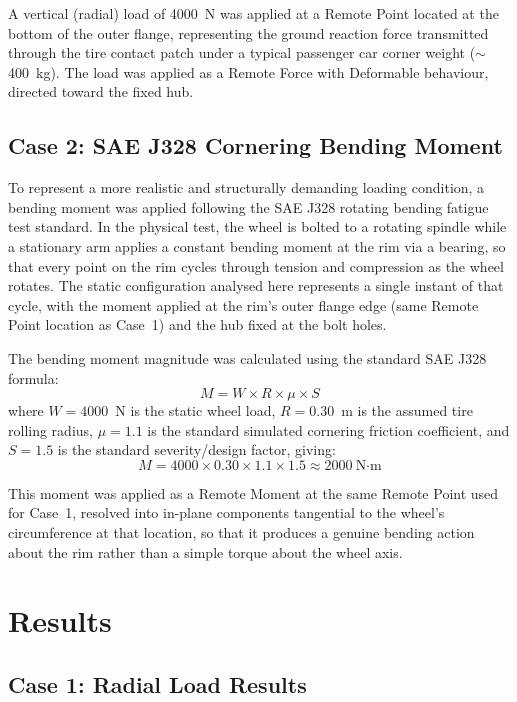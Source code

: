 \documentclass[11pt]{article}
\begin{document}
A vertical (radial) load of 4000~N was applied at a Remote Point located at the bottom of
the outer flange, representing the ground reaction force transmitted through the tire
contact patch under a typical passenger car corner weight ($\sim$400~kg). The load was
applied as a Remote Force with Deformable behaviour, directed toward the fixed hub.

\subsection{Case 2: SAE J328 Cornering Bending Moment}

To represent a more realistic and structurally demanding loading condition, a bending
moment was applied following the SAE J328 rotating bending fatigue test standard. In the
physical test, the wheel is bolted to a rotating spindle while a stationary arm applies a
constant bending moment at the rim via a bearing, so that every point on the rim cycles
through tension and compression as the wheel rotates. The static configuration analysed
here represents a single instant of that cycle, with the moment applied at the rim's outer
flange edge (same Remote Point location as Case~1) and the hub fixed at the bolt holes.

The bending moment magnitude was calculated using the standard SAE J328 formula:
\begin{equation}
M = W \times R \times \mu \times S
\label{eq:sae}
\end{equation}
where $W = 4000$~N is the static wheel load, $R = 0.30$~m is the assumed tire rolling
radius, $\mu = 1.1$ is the standard simulated cornering friction coefficient, and
$S = 1.5$ is the standard severity/design factor, giving:
\begin{equation}
M = 4000 \times 0.30 \times 1.1 \times 1.5 \approx 2000\ \text{N·m}
\label{eq:sae_value}
\end{equation}

This moment was applied as a Remote Moment at the same Remote Point used for Case~1,
resolved into in-plane components tangential to the wheel's circumference at that
location, so that it produces a genuine bending action about the rim rather than a
simple torque about the wheel axis.

\section{Results}

\subsection{Case 1: Radial Load Results}
\end{document}
